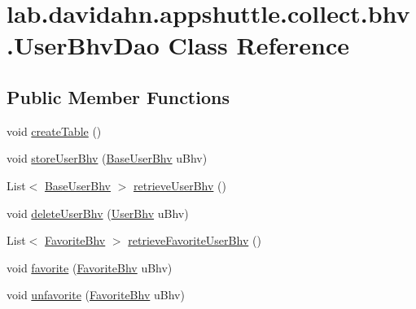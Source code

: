 \hypertarget{classlab_1_1davidahn_1_1appshuttle_1_1collect_1_1bhv_1_1_user_bhv_dao}{\section{lab.\-davidahn.\-appshuttle.\-collect.\-bhv.\-User\-Bhv\-Dao \-Class \-Reference}
\label{classlab_1_1davidahn_1_1appshuttle_1_1collect_1_1bhv_1_1_user_bhv_dao}
}
\subsection*{\-Public \-Member \-Functions}
\begin{DoxyCompactItemize}
\item 
void \hyperlink{classlab_1_1davidahn_1_1appshuttle_1_1collect_1_1bhv_1_1_user_bhv_dao_a2e8ef85400b9c1dd55c02e5f2e4a7dca}{create\-Table} ()
\item 
void \hyperlink{classlab_1_1davidahn_1_1appshuttle_1_1collect_1_1bhv_1_1_user_bhv_dao_ac0a070a1ae8f75b034a9ac196c3ceac8}{store\-User\-Bhv} (\hyperlink{classlab_1_1davidahn_1_1appshuttle_1_1collect_1_1bhv_1_1_base_user_bhv}{\-Base\-User\-Bhv} u\-Bhv)
\item 
\-List$<$ \hyperlink{classlab_1_1davidahn_1_1appshuttle_1_1collect_1_1bhv_1_1_base_user_bhv}{\-Base\-User\-Bhv} $>$ \hyperlink{classlab_1_1davidahn_1_1appshuttle_1_1collect_1_1bhv_1_1_user_bhv_dao_ad5120804f22b8a845044c7ae2806b82b}{retrieve\-User\-Bhv} ()
\item 
void \hyperlink{classlab_1_1davidahn_1_1appshuttle_1_1collect_1_1bhv_1_1_user_bhv_dao_a25150ccf03ef1c9f266cb3da9fbe91ac}{delete\-User\-Bhv} (\hyperlink{interfacelab_1_1davidahn_1_1appshuttle_1_1collect_1_1bhv_1_1_user_bhv}{\-User\-Bhv} u\-Bhv)
\item 
\-List$<$ \hyperlink{classlab_1_1davidahn_1_1appshuttle_1_1view_1_1_favorite_bhv}{\-Favorite\-Bhv} $>$ \hyperlink{classlab_1_1davidahn_1_1appshuttle_1_1collect_1_1bhv_1_1_user_bhv_dao_a25e1efeaeec8508360a9d8a4c417a9e1}{retrieve\-Favorite\-User\-Bhv} ()
\item 
void \hyperlink{classlab_1_1davidahn_1_1appshuttle_1_1collect_1_1bhv_1_1_user_bhv_dao_a1b8026558c53882ec36732c0d517bdfa}{favorite} (\hyperlink{classlab_1_1davidahn_1_1appshuttle_1_1view_1_1_favorite_bhv}{\-Favorite\-Bhv} u\-Bhv)
\item 
void \hyperlink{classlab_1_1davidahn_1_1appshuttle_1_1collect_1_1bhv_1_1_user_bhv_dao_a0e8f1168bc8d9b114d11210fa9e39b31}{unfavorite} (\hyperlink{classlab_1_1davidahn_1_1appshuttle_1_1view_1_1_favorite_bhv}{\-Favorite\-Bhv} u\-Bhv)

\end{DoxyCompactItemize}

